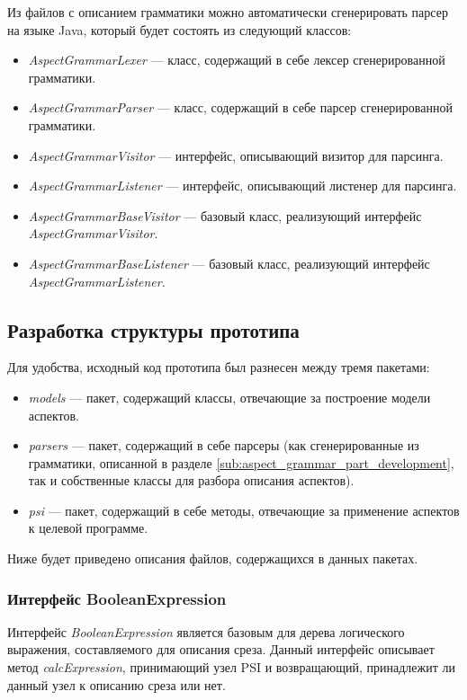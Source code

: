 Из файлов с описанием грамматики можно автоматически сгенерировать парсер на языке Java, который будет состоять из следующий классов:
\begin{itemize}
	\item \textit{AspectGrammarLexer} --- класс, содержащий в себе лексер
		  сгенерированной грамматики.
	\item \textit{AspectGrammarParser} --- класс, содержащий в себе парсер
		  сгенерированной грамматики.
	\item \textit{AspectGrammarVisitor} --- интерфейс, описывающий визитор для
		  парсинга.
	\item \textit{AspectGrammarListener} --- интерфейс, описывающий листенер
		  для парсинга.
	\item \textit{AspectGrammarBaseVisitor} --- базовый класс, реализующий
		  интерфейс \textit{AspectGrammarVisitor}.
	\item \textit{AspectGrammarBaseListener} --- базовый класс, реализующий
		  интерфейс \textit{AspectGrammarListener}.
\end{itemize}
\subsection{Разработка структуры прототипа}
\label{sub:aspect_weaving_part_development}
Для удобства, исходный код прототипа был разнесен между тремя пакетами:
\begin{itemize}
	\item \textit{models} --- пакет, содержащий классы, отвечающие за построение
		  модели аспектов.
	\item \textit{parsers} --- пакет, содержащий в себе парсеры (как
	сгенерированные из грамматики, описанной в разделе
	\ref{sub:aspect_grammar_part_development}, так и собственные классы для
	разбора описания аспектов).
	\item \textit{psi} --- пакет, содержащий в себе методы, отвечающие за
		  применение аспектов к целевой программе.
\end{itemize}
Ниже будет приведено описания файлов, содержащихся в данных пакетах.
\subsubsection{Интерфейс BooleanExpression}
\label{ssub:BooleanExpression}
Интерфейс \textit{BooleanExpression} является базовым для дерева логического
выражения, составляемого для описания среза.
Данный интерфейс описывает метод \textit{calcExpression}, принимающий узел PSI и возвращающий, принадлежит ли данный узел к описанию среза или нет.

